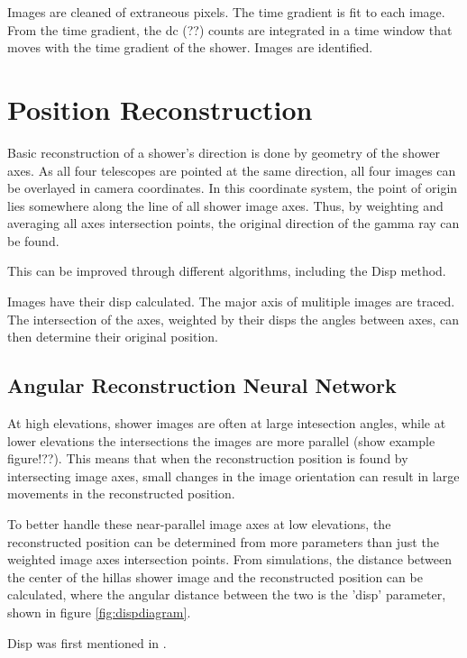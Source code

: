 Images are cleaned of extraneous pixels.
The time gradient is fit to each image.
From the time gradient, the dc (??) counts are integrated in a time window that moves with the time gradient of the shower.
Images are identified.

\section{Position Reconstruction}\label{subsec:posrecon}
Basic reconstruction of a shower's direction is done by geometry of the shower axes.
As all four telescopes are pointed at the same direction, all four images can be overlayed in camera coordinates.
In this coordinate system, the point of origin lies somewhere along the line of all shower image axes.
Thus, by weighting and averaging all axes intersection points, the original direction of the gamma ray can be found.

This can be improved through different algorithms, including the Disp method.

Images have their disp calculated.
The major axis of mulitiple images are traced.
The intersection of the axes, weighted by their disps the angles between axes, can then determine their original position.

\subsection{Angular Reconstruction Neural Network}
At high elevations, shower images are often at large intesection angles, while at lower elevations the intersections the images are more parallel (show example figure!??).
This means that when the reconstruction position is found by intersecting image axes, small changes in the image orientation can result in large movements in the reconstructed position.

To better handle these near-parallel image axes at low elevations, the reconstructed position can be determined from more parameters than just the weighted image axes intersection points.
From simulations, the distance between the center of the hillas shower image and the reconstructed position can be calculated, where the angular distance between the two is the 'disp' parameter\cite{Senturk:2011}, shown in figure \ref{fig:dispdiagram}.

Disp was first mentioned in \cite{Beilicke2012NIM}.

